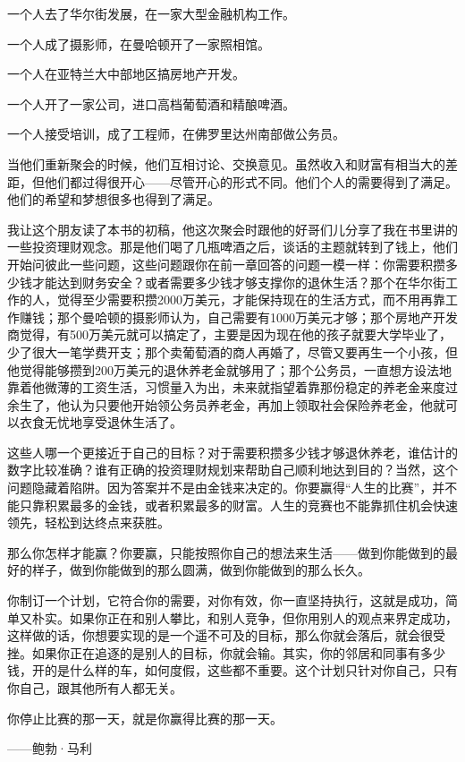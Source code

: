 一个人去了华尔街发展，在一家大型金融机构工作。

一个人成了摄影师，在曼哈顿开了一家照相馆。

一个人在亚特兰大中部地区搞房地产开发。

一个人开了一家公司，进口高档葡萄酒和精酿啤酒。

一个人接受培训，成了工程师，在佛罗里达州南部做公务员。

当他们重新聚会的时候，他们互相讨论、交换意见。虽然收入和财富有相当大的差距，但他们都过得很开心——尽管开心的形式不同。他们个人的需要得到了满足。他们的希望和梦想很多也得到了满足。

我让这个朋友读了本书的初稿，他这次聚会时跟他的好哥们儿分享了我在书里讲的一些投资理财观念。那是他们喝了几瓶啤酒之后，谈话的主题就转到了钱上，他们开始问彼此一些问题，这些问题跟你在前一章回答的问题一模一样：你需要积攒多少钱才能达到财务安全？或者需要多少钱才够支撑你的退休生活？那个在华尔街工作的人，觉得至少需要积攒2000万美元，才能保持现在的生活方式，而不用再靠工作赚钱；那个曼哈顿的摄影师认为，自己需要有1000万美元才够；那个房地产开发商觉得，有500万美元就可以搞定了，主要是因为现在他的孩子就要大学毕业了，少了很大一笔学费开支；那个卖葡萄酒的商人再婚了，尽管又要再生一个小孩，但他觉得能够攒到200万美元的退休养老金就够用了；那个公务员，一直想方设法地靠着他微薄的工资生活，习惯量入为出，未来就指望着靠那份稳定的养老金来度过余生了，他认为只要他开始领公务员养老金，再加上领取社会保险养老金，他就可以衣食无忧地享受退休生活了。

这些人哪一个更接近于自己的目标？对于需要积攒多少钱才够退休养老，谁估计的数字比较准确？谁有正确的投资理财规划来帮助自己顺利地达到目的？当然，这个问题隐藏着陷阱。因为答案并不是由金钱来决定的。你要赢得“人生的比赛”，并不能只靠积累最多的金钱，或者积累最多的财富。人生的竞赛也不能靠抓住机会快速领先，轻松到达终点来获胜。

那么你怎样才能赢？你要赢，只能按照你自己的想法来生活——做到你能做到的最好的样子，做到你能做到的那么圆满，做到你能做到的那么长久。

你制订一个计划，它符合你的需要，对你有效，你一直坚持执行，这就是成功，简单又朴实。如果你正在和别人攀比，和别人竞争，但你用别人的观点来界定成功，这样做的话，你想要实现的是一个遥不可及的目标，那么你就会落后，就会很受挫。如果你正在追逐的是别人的目标，你就会输。其实，你的邻居和同事有多少钱，开的是什么样的车，如何度假，这些都不重要。这个计划只针对你自己，只有你自己，跟其他所有人都无关。

\begin{BookQuote}
你停止比赛的那一天，就是你赢得比赛的那一天。

\hfill ——鲍勃·马利
\end{BookQuote}

